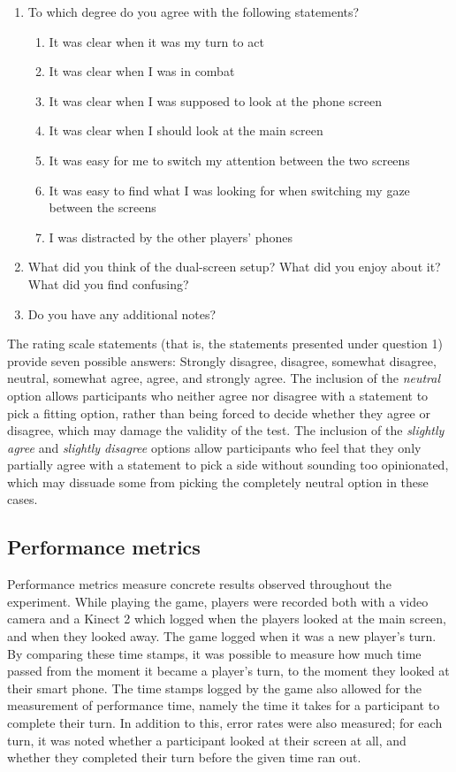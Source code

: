 \begin{enumerate}
	\item To which degree do you agree with the following statements?
	\begin{enumerate}
		\item It was clear when it was my turn to act
		\item It was clear when I was in combat
		\item It was clear when I was supposed to look at the phone screen
		\item It was clear when I should look at the main screen
		\item It was easy for me to switch my attention between the two screens
		\item It was easy to find what I was looking for when switching my gaze between the screens
		\item I was distracted by the other players' phones
	\end{enumerate}
	\item What did you think of the dual-screen setup? What did you enjoy about it? What did you find confusing?
	\item Do you have any additional notes?
\end{enumerate}

The rating scale statements (that is, the statements presented under question 1) provide seven possible answers: Strongly disagree, disagree, somewhat disagree, neutral, somewhat agree, agree, and strongly agree. The inclusion of the \textit{neutral} option allows participants who neither agree nor disagree with a statement to pick a fitting option, rather than being forced to decide whether they agree or disagree, which may damage the validity of the test. The inclusion of the \textit{slightly agree} and \textit{slightly disagree} options allow participants who feel that they only partially agree with a statement to pick a side without sounding too opinionated, which may dissuade some from picking the completely neutral option in these cases.

\subsection{Performance metrics}\label{subsec:performance_metrics}
Performance metrics measure concrete results observed throughout the experiment. While playing the game, players were recorded both with a video camera and a Kinect 2 which logged when the players looked at the main screen, and when they looked away. The game logged when it was a new player's turn. By comparing these time stamps, it was possible to measure how much time passed from the moment it became a player's turn, to the moment they looked at their smart phone. The time stamps logged by the game also allowed for the measurement of performance time, namely the time it takes for a participant to complete their turn. In addition to this, error rates were also measured; for each turn, it was noted whether a participant looked at their screen at all, and whether they completed their turn before the given time ran out. 

